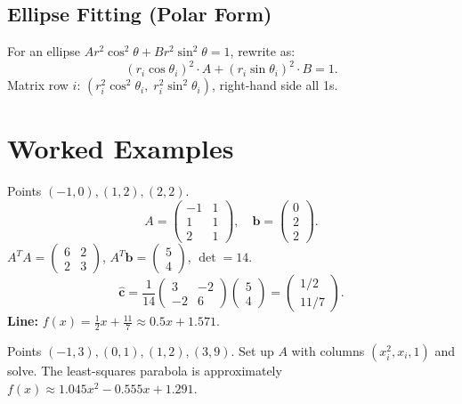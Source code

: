 \subsection*{Ellipse Fitting (Polar Form)}

For an ellipse $Ar^2\cos^2\theta + Br^2\sin^2\theta = 1$, rewrite as:
\[
  (r_i\cos\theta_i)^2 \cdot A + (r_i\sin\theta_i)^2 \cdot B = 1.
\]
Matrix row $i$: $(r_i^2\cos^2\theta_i,\; r_i^2\sin^2\theta_i)$, right-hand side all 1s.

\section{Worked Examples}

\begin{example}
Points $(-1,0),(1,2),(2,2)$.
\[
A=\begin{pmatrix}-1&1\\1&1\\2&1\end{pmatrix}, \quad \mathbf{b}=\begin{pmatrix}0\\2\\2\end{pmatrix}.
\]
$A^TA=\begin{pmatrix}6&2\\2&3\end{pmatrix}$, $A^T\mathbf{b}=\begin{pmatrix}5\\4\end{pmatrix}$, $\det=14$.
\[
\hat{\mathbf{c}}=\frac{1}{14}\begin{pmatrix}3&-2\\-2&6\end{pmatrix}\begin{pmatrix}5\\4\end{pmatrix}=\begin{pmatrix}1/2\\11/7\end{pmatrix}.
\]
\textbf{Line:} $f(x)=\tfrac{1}{2}x+\tfrac{11}{7}\approx0.5x+1.571$.
\end{example}

\begin{example}
Points $(-1,3),(0,1),(1,2),(3,9)$. Set up $A$ with columns $(x_i^2,x_i,1)$ and solve. The least-squares parabola is approximately $f(x)\approx 1.045x^2-0.555x+1.291$.
\end{example}


